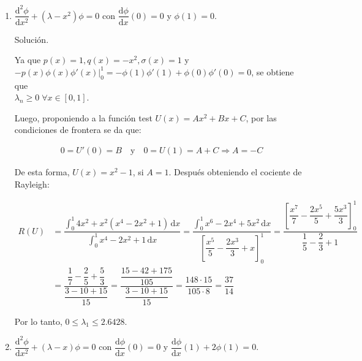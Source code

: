 \documentclass[fleqn]{article}
\newcommand{\despar}[3]{\dfrac{\mathrm{d}^#1 #2}{\mathrm{d} #3^#1}}
\newcommand{\depar}[2]{\dfrac{\mathrm{d} #1}{\mathrm{d} #2}}
\newcommand{\integ}[3]{\displaystyle \int_{#1}^{#2} #3 \, \mathrm{d} x}
\begin{document}
\begin{enumerate}[I.]
		\begin{enumerate}
			\item $ \despar{2}{\phi}{x} + (\lambda - x^2) \phi = 0 $ con $ \depar{\phi}{x} (0) = 0 $ y $ \phi (1) = 0 $.
			
			Solución.
			
			\normalfont

                Ya que $ p(x) = 1, q(x) = -x^2, \sigma(x) = 1 $ y $ \left. -p(x) \phi(x) \phi'(x) \right|_{0}^{1} = - \phi(1) \phi'(1) + \phi(0) \phi'(0) = 0 $, se obtiene que \\ $ \lambda_n \geq 0 \; \forall x \in [0,1] $.

                Luego, proponiendo a la función test $ U(x) = Ax^2 + Bx + C$, por las condiciones de frontera se da que:

                \begin{align*}
                    0 = U'(0) = B \quad \mbox{y} \quad 0 = U(1) = A + C \Longrightarrow A = -C
                \end{align*}

                De esta forma, $ U(x) = x^2 - 1 $, si $ A = 1 $. Después obteniendo el cociente de Rayleigh:

                \begin{align*}
                    R(U) &= \dfrac{\integ{0}{1}{4x^2 + x^2(x^4 - 2x^2 + 1)}}{\integ{0}{1}{x^4 - 2x^2 + 1}} = \dfrac{\integ{0}{1}{x^6 - 2x^4 + 5x^2}}{\left[ \dfrac{x^5}{5} - \dfrac{2x^3}{3} + x \right]_{0}^{1}} = \dfrac{\left[ \dfrac{x^7}{7} - \dfrac{2x^5}{5} + \dfrac{5x^3}{3} \right]_{0}^{1}}{\dfrac{1}{5} - \dfrac{2}{3} + 1} \\
                    &= \dfrac{\dfrac{1}{7} - \dfrac{2}{5} + \dfrac{5}{3}}{\dfrac{3 - 10 + 15}{15}} = \dfrac{\dfrac{15 - 42 + 175}{105}}{\dfrac{3 - 10 + 15}{15}} = \dfrac{148 \cdot 15}{105 \cdot 8} = \dfrac{37}{14} 
                \end{align*}

                Por lo tanto, $ 0 \leq \lambda_1 \leq 2.6428 $. \vspace{3mm}


			\bfseries
			
			\item $ \despar{2}{\phi}{x} + (\lambda - x) \phi = 0 $ con $ \depar{\phi}{x} (0) = 0 $ y $ \depar{\phi}{x} (1) + 2 \phi (1) = 0 $.
			

\end{enumerate}
\end{enumerate}
\end{document}
